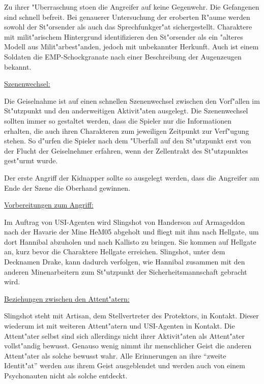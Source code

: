 Zu ihrer "Uberraschung sto\3en die Angreifer auf keine Gegenwehr. Die Gefangenen sind schnell befreit. Bei genauerer Untersuchung der eroberten R"aume werden sowohl der St"orsender als auch das Sprechfunkger"at sichergestellt. Charaktere mit milit"arischem Hintergrund identifizieren den St"orsender als ein "alteres Modell aus Milit"arbest"anden, jedoch mit unbekannter Herkunft. Auch ist einem Soldaten die EMP-Schockgranate nach einer Beschreibung der Augenzeugen bekannt.

\begin{remarks}
	\underline{Szenenwechsel:}

	Die Geiselnahme ist auf einen schnellen Szenenwechsel zwischen den Vorf"allen im St"utzpunkt und den anderweitigen Aktivit"aten ausgelegt. Die Szenenwechsel sollten immer so gestaltet werden, dass die Spieler nur die Informationen erhalten, die auch ihren Charakteren zum jeweiligen Zeitpunkt zur Verf"ugung stehen. So d"urfen die Spieler nach dem "Uberfall auf den St"utzpunkt erst von der Flucht der Geiselnehmer erfahren, wenn der Zellentrakt des St"utzpunktes gest"urmt wurde.

	Der erste Angriff der Kidnapper sollte so ausgelegt werden, dass die Angreifer am Ende der Szene die Oberhand gewinnen.

	\underline{Vorbereitungen zum Angriff:}
	
	Im Auftrag von USI-Agenten wird Slingshot von Handerson auf Armageddon nach der Havarie der Mine HeM05 abgeholt und fliegt mit ihm nach Hellgate, um dort Hannibal abzuholen und nach Kallisto zu bringen. Sie kommen auf Hellgate an, kurz bevor die Charaktere Hellgate erreichen. Slingshot, unter dem Decknamen Drake, kann dadurch verfolgen, wie Hannibal zusammen mit den anderen Minenarbeitern zum St"utzpunkt der Sicherheitsmannschaft gebracht wird.

	\underline{Beziehungen zwischen den Attent"atern:}

	Slingshot steht mit Artisan, dem Stellvertreter des Protektors, in Kontakt. Dieser wiederum ist mit weiteren Attent"atern und 
	USI-Agenten in Kontakt. Die Attent"ater selbst sind sich allerdings nicht ihrer Aktivit"aten als Attent"ater vollst"andig bewusst. Genauso wenig nimmt ihr menschlicher Geist die anderen Attent"ater als solche bewusst wahr. Alle Erinnerungen an ihre ``zweite Identit"at'' werden aus ihrem Geist ausgeblendet und werden auch von einem Psychonauten nicht als solche entdeckt.
\end{remarks}



